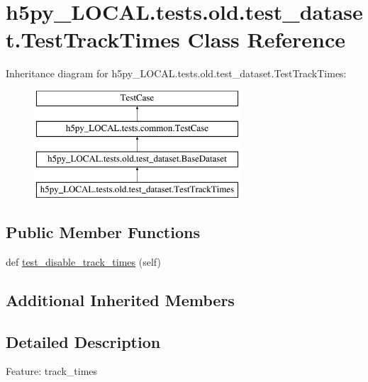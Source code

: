 \hypertarget{classh5py__LOCAL_1_1tests_1_1old_1_1test__dataset_1_1TestTrackTimes}{}\section{h5py\+\_\+\+L\+O\+C\+A\+L.\+tests.\+old.\+test\+\_\+dataset.\+Test\+Track\+Times Class Reference}
\label{classh5py__LOCAL_1_1tests_1_1old_1_1test__dataset_1_1TestTrackTimes}
Inheritance diagram for h5py\+\_\+\+L\+O\+C\+A\+L.\+tests.\+old.\+test\+\_\+dataset.\+Test\+Track\+Times\+:\begin{figure}[H]
\begin{center}
\leavevmode
\includegraphics[height=4.000000cm]{classh5py__LOCAL_1_1tests_1_1old_1_1test__dataset_1_1TestTrackTimes}
\end{center}
\end{figure}
\subsection*{Public Member Functions}
\begin{DoxyCompactItemize}
\item 
def \hyperlink{classh5py__LOCAL_1_1tests_1_1old_1_1test__dataset_1_1TestTrackTimes_a7efc801cf0dd64526009850942a58fa9}{test\+\_\+disable\+\_\+track\+\_\+times} (self)
\end{DoxyCompactItemize}
\subsection*{Additional Inherited Members}


\subsection{Detailed Description}
\begin{DoxyVerb}    Feature: track_times
\end{DoxyVerb}
 

